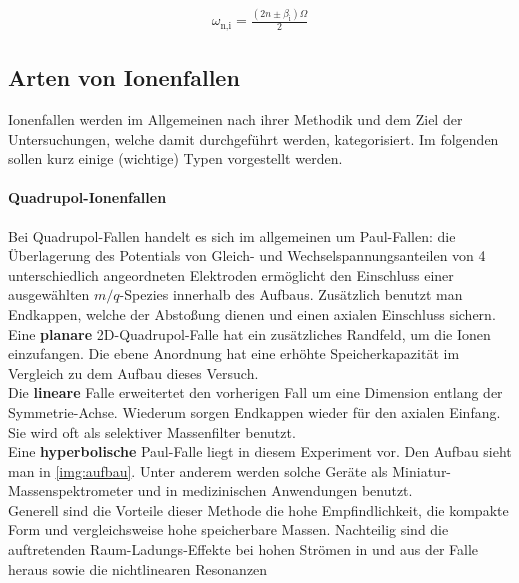 \documentclass[numbers=noenddot,a4paper,notitlepage,twoside,BCOR15mm]{scrartcl}
\newcommand{\ix}[1]{_\text{#1}}
\newcommand{\fett}[1]{\textbf{#1}}
\begin{document}
				\begin{align}
					\omega\ix{n,i}=\frac{(2n\pm\beta\ix{i})\Omega}{2} \label{eq:spektr}
				\end{align}

		\subsection{Arten von Ionenfallen}

			Ionenfallen werden im Allgemeinen nach ihrer Methodik und dem Ziel der Untersuchungen, welche damit durchgeführt werden, kategorisiert. Im folgenden sollen kurz einige (wichtige) Typen vorgestellt werden.

				\paragraph{Quadrupol-Ionenfallen}
					Bei Quadrupol-Fallen handelt es sich im allgemeinen um Paul-Fallen: die Überlagerung des Potentials von Gleich- und Wechselspannungsanteilen von 4 unterschiedlich angeordneten Elektroden ermöglicht den Einschluss einer ausgewählten $m/q$-Spezies innerhalb des Aufbaus. Zusätzlich benutzt man Endkappen, welche der Abstoßung dienen und einen axialen Einschluss sichern.\\
					Eine \fett{planare} 2D-Quadrupol-Falle hat ein zusätzliches Randfeld, um die Ionen einzufangen. Die ebene Anordnung hat eine erhöhte Speicherkapazität im Vergleich zu dem Aufbau dieses Versuch.\\
					Die \fett{lineare} Falle erweitertet den vorherigen Fall um eine Dimension entlang der Symmetrie-Achse. Wiederum sorgen Endkappen wieder für den axialen Einfang. Sie wird oft als selektiver Massenfilter benutzt.\\
					Eine \fett{hyperbolische} Paul-Falle liegt in diesem Experiment vor. Den Aufbau sieht man in \autoref{img:aufbau}. Unter anderem werden solche Geräte als Miniatur-Massenspektrometer und in medizinischen Anwendungen benutzt.\\
					Generell sind die Vorteile dieser Methode die hohe Empfindlichkeit, die kompakte Form und vergleichsweise hohe speicherbare Massen. Nachteilig sind die auftretenden Raum-Ladungs-Effekte bei hohen Strömen in und aus der Falle heraus sowie die nichtlinearen Resonanzen
\end{document}
